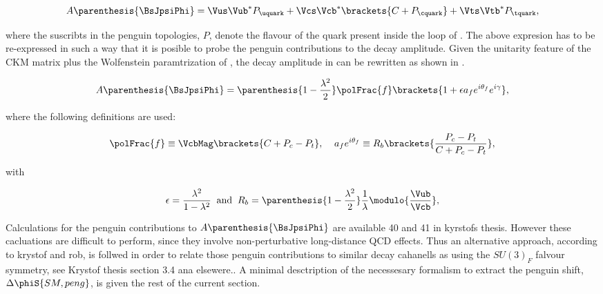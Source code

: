 \begin{equation}
A \parenthesis{\BsJpsiPhi} = \Vus\Vub^*P_{\uquark} + \Vcs\Vcb^*\brackets{C +P_{\cquark}} + \Vts\Vtb^*P_{\tquark},
 \label{bsjpsiphi_amp}
\end{equation}

\noindent where the suscribts in the penguin topologies, $P$, denote the flavour of the quark present inside the loop of .
The above expresion  has to be re-expressed in such a way that it is posible to probe the penguin contributions to
the \BsJpsiPhi decay amplitude. Given the unitarity feature of the CKM matrix plus the Wolfenstein paramtrization of ,
the decay amplitude in  can be rewritten as shown in .

\begin{equation}
  A \parenthesis{\BsJpsiPhi} = \parenthesis{1-\frac{\lambda^2}{2}} \polFrac{f} \brackets{ 1 + \epsilon a_f e^{i\theta_f} e^{i\gamma} },
 \label{bsjpsiphi_amp_param}
\end{equation}

\noindent where the following definitions are used:

\begin{equation}
  \polFrac{f} \equiv \VcbMag \brackets{C + P_c - P_t}, \;\;\;\; a_f e^{i\theta_f} \equiv R_b \brackets{ \frac{P_c - P_t}{C + P_c - P_t} },
  \label{bsjpsiphi_amp_param_defs}
\end{equation}

\noindent with

\begin{equation}
  \epsilon = \frac{\lambda^2}{1-\lambda^2} \;\;\text{and} \;\;  R_b = \parenthesis{1-\frac{\lambda^2}{2}} \frac{1}{\lambda} \modulo{\frac{\Vub}{\Vcb}},
  \label{bsjpsiphi_amp_param_defs}
\end{equation}

Calculations for the penguin contributions to $A \parenthesis{\BsJpsiPhi}$ are available {\color{red} 40 and 41 in kyrstofs thesis}.
However these cacluations are difficult to perform, since they involve non-perturbative long-distance QCD effects. Thus an alternative
approach, according to {\color{red} krystof and rob}, is follwed in order to relate those penguin contributions to similar decay cahanells
as \BsJpsiPhi using the $SU(3)_F$ falvour symmetry, see {\color{red} Krystof thesis section 3.4 ana elsewere.}.
A minimal desctription of the necessesary formalism to extract the penguin shift, $\Delta\phiS{SM,peng}$, is given the rest of the current section.

